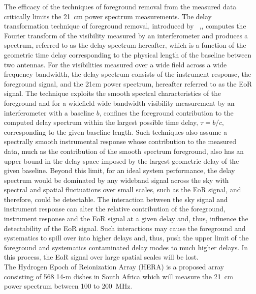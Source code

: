 \documentclass[twocolumn]{emulateapj}
\begin{document}
The efficacy of the techniques of foreground removal from the measured data critically limits the 21~cm power spectrum measurements. The delay transformation technique of foreground removal, introduced by  ~\citep{Parsons_Backer_2009},\citep{Parsons_et_al_2012}, computes the Fourier transform of the visibility measured by an interferometer and produces a spectrum, referred to as the delay spectrum hereafter, which is a function of the geometric time delay corresponding to the physical length of the baseline between two antennas. For the visibilities measured over a wide field across a wide frequency bandwidth, the delay spectrum consists of the instrument response, the foreground signal, and the 21cm power spectrum, hereafter referred to as the EoR signal.
The technique exploits the smooth spectral characteristics of the foreground and for a widefield wide bandwidth visibility measurement by an interferometer with a baseline $b$, confines the foreground contribution to the computed delay spectrum within the largest possible time delay, $\tau = b/c$, corresponding to the given baseline length. Such techniques also assume a spectrally smooth instrumental response whose contribution to the measured data, much as the contribution of the smooth spectrum foreground, also has an upper bound in the delay space imposed by the largest geometric delay of the given baseline. Beyond this limit, for an ideal system performance, the delay spectrum would be dominated by any wideband signal across the sky with spectral and spatial fluctuations over small scales, such as the EoR signal, and therefore, could be detectable. The interaction between the sky signal and instrument response can alter the relative contribution of the foreground, instrument response and the EoR signal at a given delay and, thus, influence the detectability of the EoR signal. Such interactions may cause the foreground and systematics to spill over into higher delays and, thus, push the upper limit of the foreground and systematics contaminated delay modes to much higher delays. In this process, the EoR signal over large spatial scales will be lost. \\
\indent The Hydrogen Epoch of Reionization Array (HERA) is a proposed array consisting of 568 14-m dishes in South Africa which will measure the 21~cm power spectrum between 100 to 200~MHz.
\end{document}
